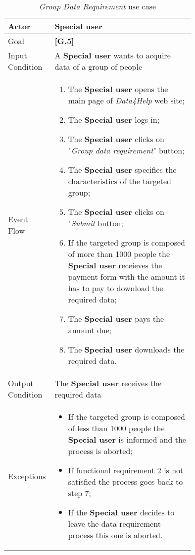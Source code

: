 \begin{center}
\begin{table}
\begin{tabular}{ | l | p{0.75\linewidth} | }
  \hline
    Actor & \textbf{Special user}\\ \hline
    Goal & \textbf{[G.5]} \\ \hline
    Input Condition & A \textbf{Special user} wants to acquire data of a group of people \\ \hline
    Event Flow & \begin{minipage}[t]{0.7\textwidth}
      \begin{enumerate}
        \item The \textbf{Special user} opens the main page of \textit{Data4Help} web site;
        \item The \textbf{Special user} logs in;
        \item The \textbf{Special user} clicks on "\textit{Group data requirement}" button;
        \item The \textbf{Special user} specifies the characteristics of the targeted group;
        \item The \textbf{Special user} clicks on "\textit{Submit} button;
        \item If the targeted group is composed of more than 1000 people the \textbf{Special user} receieves the payment form with the amount it has to pay to download the required data;
        \item The \textbf{Special user} pays the amount due;
        \item The \textbf{Special user} downloads the required data.
      \end{enumerate}
    \smallskip
  \end{minipage} \\ \hline
  Output Condition & The \textbf{Special user} receives the required data \\ \hline
  Exceptions & \begin{minipage}[t]{0.7\textwidth}
    \begin{itemize}
      \smallskip
      \item If the targeted group is composed of less than 1000 people the \textbf{Special user} is informed and the process is aborted;
      \item If functional requirement 2 is not satisfied the process goes back to step 7;
      \item If the \textbf{Special user} decides to leave the data requirement process this one is aborted.
    \end{itemize}
    \smallskip
  \end{minipage}  \\ \hline
\end{tabular}
\caption{\textit{Group Data Requirement} use case}
\label{table:groupDataRequirement}
\end{table}
\end{center}
